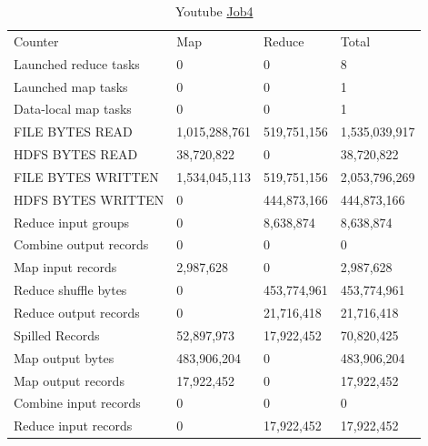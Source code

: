 \documentclass[paper=a4, fontsize=11pt]{scrartcl}	%
\numberwithin{equation}{section}															%
\numberwithin{figure}{section}																%
\numberwithin{table}{section}																%
\begin{document}
\begin{table}[!h]
	\centering
	\caption{Youtube \href{http://hadoop-compute0.di.univr.it:50030/jobdetails.jsp?jobid=job_201603141010_12294}{Job4}}
	\label{my-label}
	\begin{tabular}{llll}
		Counter	&Map	&Reduce	&Total\\
		Launched reduce tasks&	0&	0&	8\\
		Launched map tasks&	0&	0&	1\\
		Data-local map tasks&	0&	0&	1\\
		FILE BYTES READ	&1,015,288,761&	519,751,156&	1,535,039,917\\
		HDFS BYTES READ&	38,720,822&	0&	38,720,822\\
		FILE BYTES WRITTEN&	1,534,045,113&	519,751,156&	2,053,796,269\\
		HDFS BYTES WRITTEN&	0&	444,873,166&	444,873,166\\
		Reduce input groups&	0&	8,638,874&	8,638,874\\
		Combine output records&	0&	0&	0\\
		Map input records&	2,987,628&	0&	2,987,628\\
		Reduce shuffle bytes&	0&	453,774,961&	453,774,961\\
		Reduce output records&	0&	21,716,418&	21,716,418\\
		Spilled Records&	52,897,973&	17,922,452&	70,820,425\\
		Map output bytes&	483,906,204&	0&	483,906,204\\
		Map output records&	17,922,452&	0&	17,922,452\\
		Combine input records&	0&	0&	0\\
		Reduce input records&	0&	17,922,452&	17,922,452\\
	\end{tabular}
\end{table}
\end{document}
